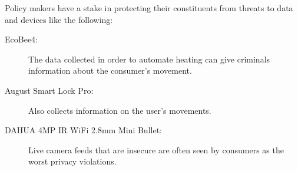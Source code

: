 \begin{mdframed}[backgroundcolor=gray!10]
Policy makers have a stake in protecting their constituents from threats to data and devices like the following:

\begin{description}
\item[EcoBee4:] The data collected in order to automate heating can give criminals information about the consumer’s movement. 
\item[August Smart Lock Pro:] Also collects information on the user’s movements.
\item[DAHUA 4MP IR WiFi 2.8mm Mini Bullet:] Live camera feeds that are insecure are often seen by consumers as the worst privacy violations.
\end{description}

\end{mdframed}
